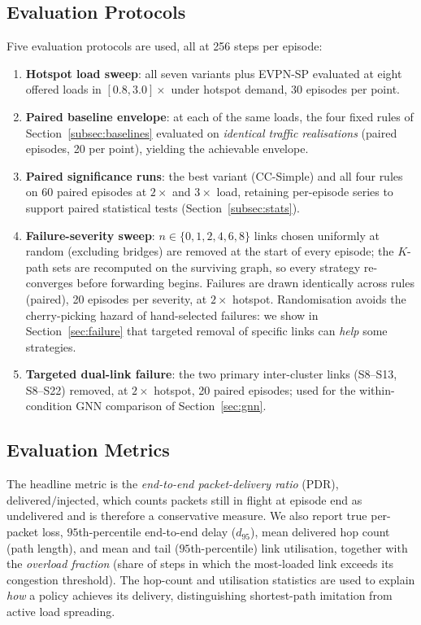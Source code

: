 \documentclass[10pt,journal,comsoc]{IEEEtran}
\begin{document}
\subsection{Evaluation Protocols}
\label{subsec:protocols}
Five evaluation protocols are used, all at 256 steps per episode:
\begin{enumerate}
  \item \textbf{Hotspot load sweep}: all seven variants plus EVPN-SP evaluated at eight offered loads in $[0.8,3.0]\times$ under hotspot demand, 30 episodes per point.
  \item \textbf{Paired baseline envelope}: at each of the same loads, the four fixed rules of Section~\ref{subsec:baselines} evaluated on \emph{identical traffic realisations} (paired episodes, 20 per point), yielding the achievable envelope.
  \item \textbf{Paired significance runs}: the best variant (CC-Simple) and all four rules on 60 paired episodes at $2\times$ and $3\times$ load, retaining per-episode series to support paired statistical tests (Section~\ref{subsec:stats}).
  \item \textbf{Failure-severity sweep}: $n \in \{0,1,2,4,6,8\}$ links chosen uniformly at random (excluding bridges) are removed at the start of every episode; the $K$-path sets are recomputed on the surviving graph, so every strategy re-converges before forwarding begins. Failures are drawn identically across rules (paired), 20 episodes per severity, at $2\times$ hotspot. Randomisation avoids the cherry-picking hazard of hand-selected failures: we show in Section~\ref{sec:failure} that targeted removal of specific links can \emph{help} some strategies.
  \item \textbf{Targeted dual-link failure}: the two primary inter-cluster links (S8--S13, S8--S22) removed, at $2\times$ hotspot, 20 paired episodes; used for the within-condition GNN comparison of Section~\ref{sec:gnn}.
\end{enumerate}

\subsection{Evaluation Metrics}
The headline metric is the \emph{end-to-end packet-delivery ratio} (PDR), $\text{delivered}/\text{injected}$, which counts packets still in flight at episode end as undelivered and is therefore a conservative measure. We also report true per-packet loss, $95$th-percentile end-to-end delay ($d_{95}$), mean delivered hop count (path length), and mean and tail ($95$th-percentile) link utilisation, together with the \emph{overload fraction} (share of steps in which the most-loaded link exceeds its congestion threshold). The hop-count and utilisation statistics are used to explain \emph{how} a policy achieves its delivery, distinguishing shortest-path imitation from active load spreading.
\end{document}
